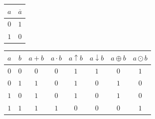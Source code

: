 \begin{table}[h!]
\centering
\renewcommand{\arraystretch}{1.2}
\begin{tabular}{c||c}
\hline
$a$ & $\overline{a}$ \\
\hline\hline
$0$ & $1$ \\
$1$ & $0$ \\
\hline
\end{tabular}
\qquad
\begin{tabular}{cc||c|c|c|c|c|c}
\hline
$a$ & $b$ & $a + b$ & $a \cdot b$ & $a \uparrow b$ & $a \downarrow b$ & $a \oplus b$ & $a \odot b$ \\
\hline\hline
$0$ & $0$ & $0$ & $0$ & $1$ & $1$ & $0$ & $1$ \\
$0$ & $1$ & $1$ & $0$ & $1$ & $0$ & $1$ & $0$ \\
$1$ & $0$ & $1$ & $0$ & $1$ & $0$ & $1$ & $0$ \\
$1$ & $1$ & $1$ & $1$ & $0$ & $0$ & $0$ & $1$ \\
\hline
\end{tabular}
\end{table}

\makeatother

